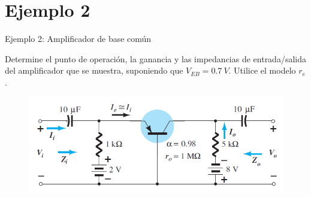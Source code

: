 \documentclass[t,aspectratio=169]{beamer}
\begin{document}
\section{Ejemplo 2}
\begin{frame}{Ejemplo 2: Amplificador de base común}

Determine el punto de operación, la ganancia y las impedancias de entrada/salida del amplificador que se muestra, suponiendo que $V_{EB} = 0.7\ V$. Utilice el modelo $r_e$.

\begin{figure}[H]
    \centering
    \includegraphics[width=\textwidth]{figuras/modelo_re_base_comun_3.png}
\end{figure}

\end{frame}
\end{document}
